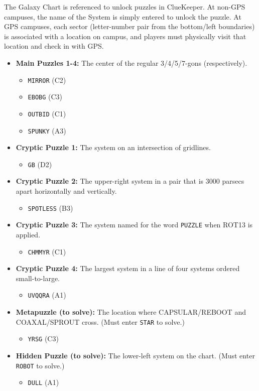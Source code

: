 The Galaxy Chart is referenced to unlock puzzles in ClueKeeper.
At non-GPS campuses, the name of the System is simply entered to
unlock the puzzle. At GPS campuses, each sector (letter-number pair
from the bottom/left boundaries) is associated with a location on
campus, and players must physically visit that location and check
in with GPS. 

\begin{itemize}
\item
  \textbf{Main Puzzles 1-4:} The center of the regular 3/4/5/7-gons (respectively).
  \begin{itemize}
  \item \texttt{MIRROR} (C2)
  \item \texttt{EBOBG} (C3)
  \item \texttt{OUTBID} (C1)
  \item \texttt{SPUNKY} (A3)
  \end{itemize}
\item
  \textbf{Cryptic Puzzle 1:} The system on an intersection of gridlines.
\begin{itemize}\item\texttt{GB} (D2)\end{itemize}
\item
  \textbf{Cryptic Puzzle 2:} The upper-right system in a pair that is 3000 parsecs
  apart horizontally and vertically. 
\begin{itemize}\item\texttt{SPOTLESS} (B3)\end{itemize}
\item
  \textbf{Cryptic Puzzle 3:} The system named for the word \texttt{PUZZLE} when
  ROT13 is applied. 
\begin{itemize}\item\texttt{CHMMYR} (C1)\end{itemize}
\item
  \textbf{Cryptic Puzzle 4:} The largest system in a line of four systems ordered small-to-large. 
\begin{itemize}\item\texttt{UVQQRA} (A1)\end{itemize}
\item
  \textbf{Metapuzzle (to solve):} The location where CAPSULAR/REBOOT and COAXAL/SPROUT cross.
  (Must enter \texttt{STAR} to solve.)
\begin{itemize}\item\texttt{YRSG} (C3)\end{itemize}
\item
  \textbf{Hidden Puzzle (to solve):} The lower-left system on the chart. (Must enter \texttt{ROBOT} to solve.)
\begin{itemize}\item\texttt{DULL} (A1)\end{itemize}
\end{itemize} 
